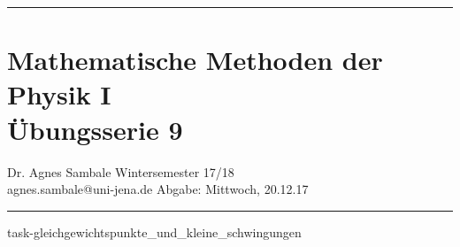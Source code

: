 \documentclass[a4paper,fleqn, 10pt]{article}
\begin{document}
	\pagestyle{empty}

	\hrule
	\section*{\centering Mathematische Methoden der Physik I \\ Übungsserie 9}
	\medskip
	Dr. Agnes Sambale \hfill Wintersemester 17/18\\
	agnes.sambale@uni-jena.de \hfill Abgabe: Mittwoch, 20.12.17
	\bigskip
	\hrule
	\bigskip
	\bigskip

	\atiShowSolutionsfalse

	
	\bigskip
	
	\newpage
	{task-gleichgewichtspunkte_und_kleine_schwingungen}




\end{document}
